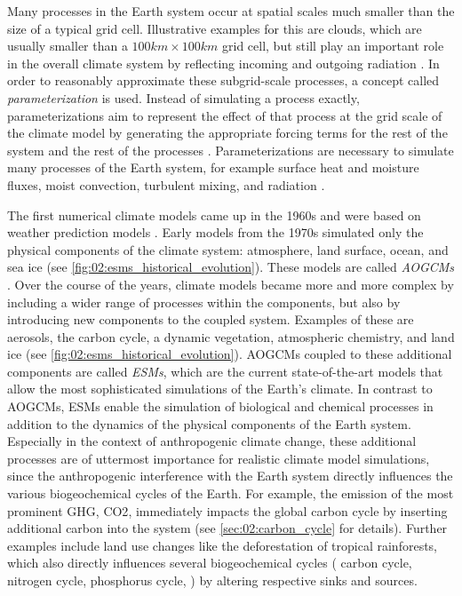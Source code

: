 Many processes in the Earth system occur at spatial scales much smaller than
the size of a typical grid cell. Illustrative examples for this are clouds,
which are usually smaller than a $100 \unit{km} \times 100 \unit{km}$ grid
cell, but still play an important role in the overall climate system by
reflecting incoming and outgoing radiation \autocite{Boucher2013}. In order to
reasonably approximate these subgrid-scale processes, a concept called
\emph{parameterization} is used. Instead of simulating a process exactly,
parameterizations aim to represent the effect of that process at the grid scale
of the climate model by generating the appropriate forcing terms for the rest
of the system and the rest of the processes \autocite{Gettelman2016}.
Parameterizations are necessary to simulate many processes of the Earth system,
for example surface heat and moisture fluxes, moist convection, turbulent
mixing, and radiation \autocite{Holton2004}.

The first numerical climate models came up in the 1960s and were based on
weather prediction models \autocite{Flato2011}. Early models from the 1970s
simulated only the physical components of the climate system: atmosphere, land
surface, ocean, and sea ice (see \cref{fig:02:esms_historical_evolution}).
These models are called \emph{\acfp{AOGCM}} \autocite{Flato2013}. Over the
course of the years, climate models became more and more complex by including a
wider range of processes within the components, but also by introducing new
components to the coupled system. Examples of these are aerosols, the carbon
cycle, a dynamic vegetation, atmospheric chemistry, and land ice (see
\cref{fig:02:esms_historical_evolution}). \Acp{AOGCM} coupled to these
additional components are called \emph{\acfp{ESM}}, which are the current
state-of-the-art models that allow the most sophisticated simulations of the
Earth's climate. In contrast to \acp{AOGCM}, \acp{ESM} enable the simulation of
biological and chemical processes in addition to the dynamics of the physical
components of the Earth system. Especially in the context of anthropogenic
climate change, these additional processes are of uttermost importance for
realistic climate model simulations, since the anthropogenic interference with
the Earth system directly influences the various biogeochemical cycles of the
Earth. For example, the emission of the most prominent \ac{GHG}, \ac{CO2},
immediately impacts the global carbon cycle by inserting additional carbon into
the system (see \cref{sec:02:carbon_cycle} for details). Further examples
include land use changes like the deforestation of tropical rainforests, which
also directly influences several biogeochemical cycles (\eg{} carbon cycle,
nitrogen cycle, phosphorus cycle, \etc{}) by altering respective sinks and
sources.

